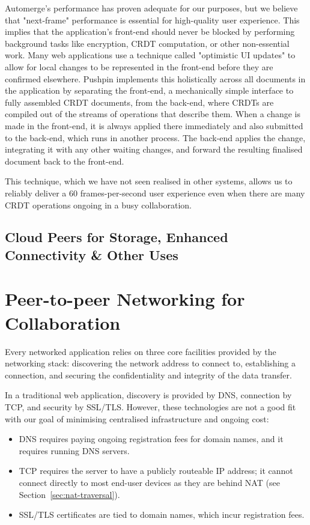 \documentclass[sigplan,10pt]{acmart}
\begin{document}
Automerge's performance has proven adequate for our purposes, but we believe that "next-frame" performance is essential for high-quality user experience. This implies that the application's front-end should never be blocked by performing background tasks like encryption, CRDT computation, or other non-essential work. Many web applications use a technique called "optimistic UI updates" to allow for local changes to be represented in the front-end before they are confirmed elsewhere. Pushpin implements this holistically across all documents in the application by separating the front-end, a mechanically simple interface to fully assembled CRDT documents, from the back-end, where CRDTs are compiled out of the streams of operations that describe them. When a change is made in the front-end, it is always applied there immediately and also submitted to the back-end, which runs in another process. The back-end applies the change, integrating it with any other waiting changes, and forward the resulting finalised document back to the front-end.

This technique, which we have not seen realised in other systems, allows us to reliably deliver a 60 frames-per-second user experience even when there are many CRDT operations ongoing in a busy collaboration.

\subsection{Cloud Peers for Storage, Enhanced Connectivity \& Other Uses}

\section{Peer-to-peer Networking for Collaboration}\label{sec:networking}

Every networked application relies on three core facilities provided by the networking stack: discovering the network address to connect to, establishing a connection, and securing the confidentiality and integrity of the data transfer.

In a traditional web application, discovery is provided by DNS, connection by TCP, and security by SSL/TLS.
However, these technologies are not a good fit with our goal of minimising centralised infrastructure and ongoing cost:
\begin{itemize}
    \item DNS requires paying ongoing registration fees for domain names, and it requires running DNS servers.
    \item TCP requires the server to have a publicly routeable IP address; it cannot connect directly to most end-user devices as they are behind NAT (see Section~\ref{sec:nat-traversal}).
    \item SSL/TLS certificates are tied to domain names, which incur registration fees.
\end{itemize}
\end{document}

